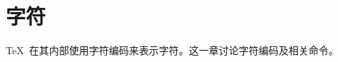 \documentclass{book}
\begin{document}
\chapter{字符}\label{char}

\TeX\ 在其内部使用字符编码来表示字符。这一章讨论字符编码及相关命令。

\label{cschap:char}\label{cschap:chardef}\label{cschap:accent}\label{cschap:uccode}\label{cschap:lccode}
\label{cschap:uppercase}\label{cschap:lowercase}\label{cschap:string}\label{cschap:escapechar}
\end{document}
